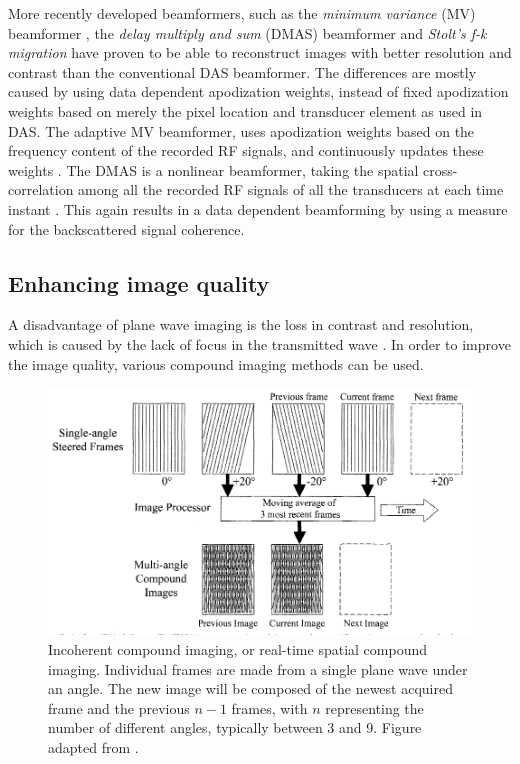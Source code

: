 More recently developed beamformers, such as the \textit{minimum variance} (MV) beamformer \cite{holfort_plane_2008}, the \textit{delay multiply and sum} (DMAS) beamformer \cite{matrone_delay_2015} and \textit{Stolt's f-k migration} \cite{garcia_stolts_2013} have proven to be able to reconstruct images with better resolution and contrast than the conventional DAS beamformer. The differences are mostly caused by using data dependent apodization weights, instead of fixed apodization weights based on merely the pixel location and transducer element as used in DAS. The adaptive MV beamformer, uses apodization weights based on the frequency content of the recorded RF signals, and continuously updates these weights \cite{holfort_plane_2008}. The DMAS is a nonlinear beamformer, taking the spatial cross-correlation among all the recorded RF signals of all the transducers at each time instant \cite{matrone_delay_2015}. This again results in a data dependent beamforming by using a measure for the backscattered signal coherence. 

\bigskip




\subsection{Enhancing image quality}
A disadvantage of plane wave imaging is the loss in contrast and resolution, which is caused by the lack of focus in the transmitted wave \cite{montaldo_coherent_2009}. In order to improve the image quality, various compound imaging methods can be used. 

\begin{figure}[t]
  \centering
  \includegraphics[width=.8\linewidth]{Figures/Ultrasound/spatial_compounding.pdf}
  \caption{Incoherent compound imaging, or real-time spatial compound imaging. Individual frames are made from a single plane wave under an angle. The new image will be composed of the newest acquired frame and the previous $n-1$ frames, with $n$ representing the number of different angles, typically between 3 and 9. Figure adapted from \citet{entrekin_real-time_2001}.}
  \label{fig:us_spatial_compounding}
\end{figure}

